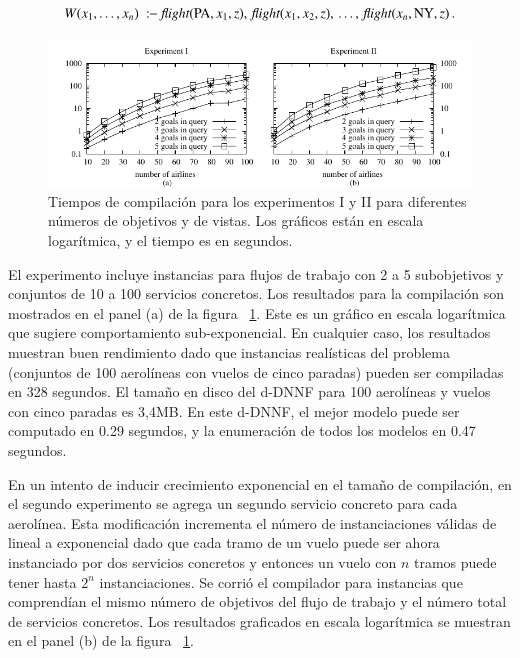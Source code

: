 \[ W(x_1,\ldots,x_n)\ \qrule\ \flight(\PA,x_1,z),\,\flight(x_1,x_2,z),\,\ldots,\,\flight(x_n,\NY,z)\,. \]

\begin{figure}[t]
\centering
\includegraphics[width=1\textwidth]{graphics/plot1}
\caption{Tiempos de compilación para los experimentos I y II para diferentes
números de objetivos y de vistas. Los gráficos están en escala logarítmica, y el
tiempo es en segundos.}
\label{fig:plot1}
\end{figure}

El experimento incluye instancias para flujos de trabajo con 2 a 5 subobjetivos
y conjuntos de 10 a 100 servicios concretos. Los resultados para la compilación
son mostrados en el panel (a) de la figura ~\ref{fig:plot1}. Este es un gráfico en escala
logarítmica que sugiere comportamiento sub-exponencial. En cualquier caso, los
resultados muestran buen rendimiento dado que instancias realísticas del
problema (conjuntos de 100 aerolíneas con vuelos de cinco paradas) pueden ser
compiladas en 328 segundos. El tamaño en disco del d-DNNF para 100 aerolíneas y
vuelos con cinco paradas es 3,4MB. En este d-DNNF, el mejor modelo puede ser
computado en 0.29 segundos, y la enumeración de todos los modelos en 0.47
segundos.

En un intento de inducir crecimiento exponencial en el tamaño de compilación, en
el segundo experimento se agrega un segundo servicio concreto para cada
aerolínea. Esta modificación incrementa el número de instanciaciones válidas de
lineal a exponencial dado que cada tramo de un vuelo puede ser ahora instanciado
por dos servicios concretos y entonces un vuelo con $n$ tramos puede tener hasta
$2^n$ instanciaciones. Se corrió el compilador para instancias que comprendían
el mismo número de objetivos del flujo de trabajo y el número total de
servicios concretos. Los resultados graficados en escala logarítmica se muestran
en el panel (b) de la figura ~\ref{fig:plot1}.

